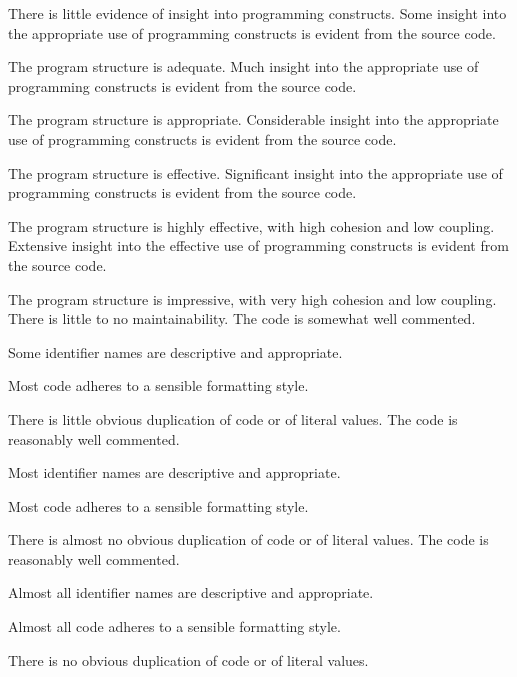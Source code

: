 \begin{markingrubric}
        \grade \fail There is little evidence of insight into programming constructs.
        \grade Some insight into the appropriate use of programming constructs is evident from the source code.
            \par The program structure is adequate.
        \grade Much insight into the appropriate use of programming constructs is evident from the source code.
            \par The program structure is appropriate.
        \grade Considerable insight into the appropriate use of programming constructs is evident from the source code.
            \par The program structure is effective.
        \grade Significant insight into the appropriate use of programming constructs is evident from the source code.
            \par The program structure is highly effective, with high cohesion and low coupling.
        \grade Extensive insight into the effective use of programming constructs is evident from the source code.
            \par The program structure is impressive, with very high cohesion and low coupling.
%
        \grade \fail There is little to no maintainability. 
        \grade The code is somewhat well commented.
            \par Some identifier names are descriptive and appropriate.
            \par Most code adheres to a sensible formatting style.
             \par There is little obvious duplication of code or of literal values.           
        \grade The code is reasonably well commented.
            \par Most identifier names are descriptive and appropriate.
            \par Most code adheres to a sensible formatting style.
             \par There is almost no obvious duplication of code or of literal values.   
        \grade The code is reasonably well commented.
            \par Almost all identifier names are descriptive and appropriate.
            \par Almost all code adheres to a sensible formatting style.
             \par There is no obvious duplication of code or of literal values.

\end{markingrubric}
